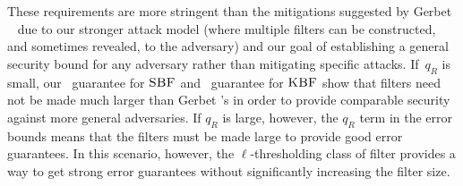 These requirements are more stringent than the mitigations suggested by Gerbet
\etal~\cite{gerbet2015power} due to our stronger attack model (where multiple
filters can be constructed, and sometimes revealed, to the adversary) and our
goal of establishing a general security bound for any adversary rather than
mitigating specific attacks. If~$q_R$ is small, our \erreps\ guarantee for
$\textnormal{\textsc{SBF}}$ and \errep\ guarantee for $\textnormal{\textsc{KBF}}$ show that filters need not be made much
larger than Gerbet \etal's in order to provide comparable security against more
general adversaries. If $q_R$ is large, however, the $q_R$ term in the error
bounds means that the filters must be made large to provide good error
guarantees. In this scenario, however, the $\ell$-thresholding class of filter
provides a way to get strong error guarantees without significantly increasing
the filter size.
